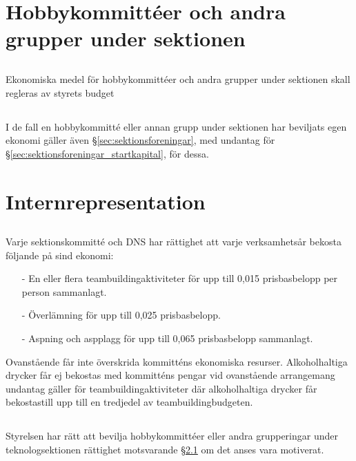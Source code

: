 \documentclass[a4paper, 10pt]{article}
\begin{document}
\section{Hobbykommittéer och andra grupper under sektionen}
\subsection{}
Ekonomiska medel för hobbykommittéer och andra grupper under sektionen skall regleras av styrets budget
\subsection{}
I de fall en hobbykommitté eller annan grupp under sektionen har beviljats egen ekonomi gäller även \S\ref{sec:sektionsforeningar}, med undantag för \S\ref{sec:sektionsforeningar_startkapital}, för dessa.

\section{Internrepresentation}
\subsection{}
\label{sec:internreps}
Varje sektionskommitté och DNS har rättighet att varje verksamhetsår bekosta följande på sind ekonomi:
\begin{itemize}
    \item[-] En eller flera teambuildingaktiviteter för upp till 0,015 prisbasbelopp per person sammanlagt.
    \item[-] Överlämning för upp till 0,025 prisbasbelopp.
    \item[-] Aspning och aspplagg för upp till 0,065 prisbasbelopp sammanlagt.
\end{itemize}

Ovanstående får inte överskrida kommitténs ekonomiska resurser. Alkoholhaltiga drycker får ej bekostas med kommitténs pengar vid ovanstående arrangemang undantag gäller för teambuildingaktiviteter där alkoholhaltiga drycker får bekostastill upp till en tredjedel av teambuildingbudgeten.

\subsection{}
Styrelsen har rätt att bevilja hobbykommittéer eller andra grupperingar under teknologsektionen rättighet motsvarande \S\ref{sec:internreps} om det anses vara motiverat.
\end{document}
